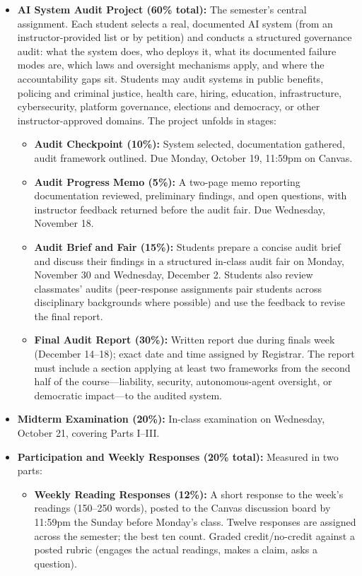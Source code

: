 \documentclass[12pt]{article}
\begin{document}
\begin{itemize}
    \item \textbf{AI System Audit Project (60\% total):} The semester's central assignment. Each student selects a real, documented AI system (from an instructor-provided list or by petition) and conducts a structured governance audit: what the system does, who deploys it, what its documented failure modes are, which laws and oversight mechanisms apply, and where the accountability gaps sit. Students may audit systems in public benefits, policing and criminal justice, health care, hiring, education, infrastructure, cybersecurity, platform governance, elections and democracy, or other instructor-approved domains. The project unfolds in stages:
    \begin{itemize}
        \item \textbf{Audit Checkpoint (10\%):} System selected, documentation gathered, audit framework outlined. Due Monday, October 19, 11:59pm on Canvas.
        \item \textbf{Audit Progress Memo (5\%):} A two-page memo reporting documentation reviewed, preliminary findings, and open questions, with instructor feedback returned before the audit fair. Due Wednesday, November 18.
        \item \textbf{Audit Brief and Fair (15\%):} Students prepare a concise audit brief and discuss their findings in a structured in-class audit fair on Monday, November 30 and Wednesday, December 2. Students also review classmates' audits (peer-response assignments pair students across disciplinary backgrounds where possible) and use the feedback to revise the final report.
        \item \textbf{Final Audit Report (30\%):} Written report due during finals week (December 14--18); exact date and time assigned by Registrar. The report must include a section applying at least two frameworks from the second half of the course---liability, security, autonomous-agent oversight, or democratic impact---to the audited system.
    \end{itemize}
    \item \textbf{Midterm Examination (20\%):} In-class examination on Wednesday, October 21, covering Parts I--III.
    \item \textbf{Participation and Weekly Responses (20\% total):} Measured in two parts:
    \begin{itemize}
        \item \textbf{Weekly Reading Responses (12\%):} A short response to the week's readings (150--250 words), posted to the Canvas discussion board by 11:59pm the Sunday before Monday's class. Twelve responses are assigned across the semester; the best ten count. Graded credit/no-credit against a posted rubric (engages the actual readings, makes a claim, asks a question).

\end{itemize}
\end{itemize}
\end{document}
